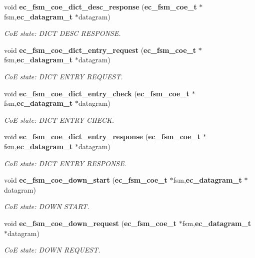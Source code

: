 \begin{DoxyCompactItemize}
void {\bf ec\-\_\-fsm\-\_\-coe\-\_\-dict\-\_\-desc\-\_\-response} ({\bf ec\-\_\-fsm\-\_\-coe\-\_\-t} $\ast$fsm,{\bf ec\-\_\-datagram\-\_\-t} $\ast$datagram)
\begin{DoxyCompactList}\small\item\em \-Co\-E state\-: \-D\-I\-C\-T \-D\-E\-S\-C \-R\-E\-S\-P\-O\-N\-S\-E. \end{DoxyCompactList}\item 
void {\bf ec\-\_\-fsm\-\_\-coe\-\_\-dict\-\_\-entry\-\_\-request} ({\bf ec\-\_\-fsm\-\_\-coe\-\_\-t} $\ast$fsm,{\bf ec\-\_\-datagram\-\_\-t} $\ast$datagram)
\begin{DoxyCompactList}\small\item\em \-Co\-E state\-: \-D\-I\-C\-T \-E\-N\-T\-R\-Y \-R\-E\-Q\-U\-E\-S\-T. \end{DoxyCompactList}\item 
void {\bf ec\-\_\-fsm\-\_\-coe\-\_\-dict\-\_\-entry\-\_\-check} ({\bf ec\-\_\-fsm\-\_\-coe\-\_\-t} $\ast$fsm,{\bf ec\-\_\-datagram\-\_\-t} $\ast$datagram)
\begin{DoxyCompactList}\small\item\em \-Co\-E state\-: \-D\-I\-C\-T \-E\-N\-T\-R\-Y \-C\-H\-E\-C\-K. \end{DoxyCompactList}\item 
void {\bf ec\-\_\-fsm\-\_\-coe\-\_\-dict\-\_\-entry\-\_\-response} ({\bf ec\-\_\-fsm\-\_\-coe\-\_\-t} $\ast$fsm,{\bf ec\-\_\-datagram\-\_\-t} $\ast$datagram)
\begin{DoxyCompactList}\small\item\em \-Co\-E state\-: \-D\-I\-C\-T \-E\-N\-T\-R\-Y \-R\-E\-S\-P\-O\-N\-S\-E. \end{DoxyCompactList}\item 
void {\bf ec\-\_\-fsm\-\_\-coe\-\_\-down\-\_\-start} ({\bf ec\-\_\-fsm\-\_\-coe\-\_\-t} $\ast$fsm,{\bf ec\-\_\-datagram\-\_\-t} $\ast$datagram)
\begin{DoxyCompactList}\small\item\em \-Co\-E state\-: \-D\-O\-W\-N \-S\-T\-A\-R\-T. \end{DoxyCompactList}\item 
void {\bf ec\-\_\-fsm\-\_\-coe\-\_\-down\-\_\-request} ({\bf ec\-\_\-fsm\-\_\-coe\-\_\-t} $\ast$fsm,{\bf ec\-\_\-datagram\-\_\-t} $\ast$datagram)
\begin{DoxyCompactList}\small\item\em \-Co\-E state\-: \-D\-O\-W\-N \-R\-E\-Q\-U\-E\-S\-T. \end{DoxyCompactList}\item 

\end{DoxyCompactItemize}
